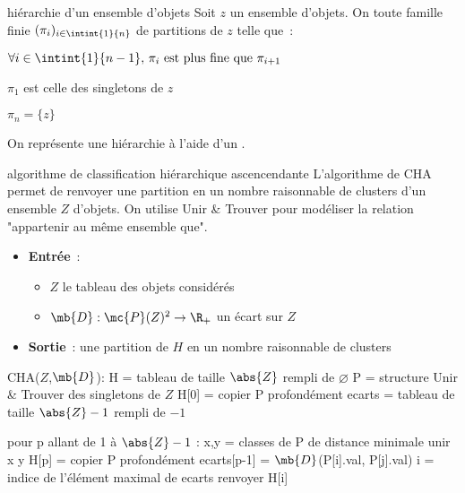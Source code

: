 \begin{adjustwidth}{-3cm}{-3cm}
\begin{definition}{5.11}{hiérarchie d'un ensemble d'objets}
    Soit $z$ un ensemble d'objets. On  toute famille finie $(\pi_i)_{i \in \intint{1}{n}}$ de partitions de $z$ telle que~:
    \begin{enumeratebf}
        \item $\forall i\in \intint{1}{n-1},\, \pi_i \text{ est plus fine que } \pi_{i+1}$
        \item $\pi_1$ est celle des singletons de $z$
        \item $\pi_n = \{z\}$
    \end{enumeratebf}
    On représente une hiérarchie à l'aide d'un .
\end{definition}

\begin{implementation}{algorithme de classification hiérarchique ascencendante}
    L'algorithme de CHA permet de renvoyer une partition en un nombre raisonnable de clusters d'un ensemble $Z$ d'objets. On utilise Unir \& Trouver pour modéliser la relation "appartenir au même ensemble que".
    \begin{itemize}
        \item \textbf{Entrée}~: \begin{itemize}
            \item $Z$ le tableau des objets considérés
            \item $\mb{D}:\mc{P}(Z)^2 \to \R_+$ un écart sur $Z$
        \end{itemize}
        \item \textbf{Sortie}~: une partition de $H$ en un nombre raisonnable de clusters
    \end{itemize}
    \begin{lstLNat}
    CHA($Z$,$\mb{D}$):
        H = tableau de taille $\abs{Z}$ rempli de $\varnothing$
        P = structure Unir & Trouver des singletons de $Z$
        H[0] = copier P profondément
        ecarts = tableau de taille $\abs{Z} - 1$ rempli de $-1$
        
        pour p allant de 1 à $\abs{Z}-1$ :
            x,y = classes de P de distance minimale
            unir x y
            H[p] = copier P profondément
            ecarts[p-1] = $\mb{D}$(P[i].val, P[j].val)
        i = indice de l'élément maximal de ecarts
        renvoyer H[i]
    \end{lstLNat}
\end{implementation}


\end{adjustwidth}
